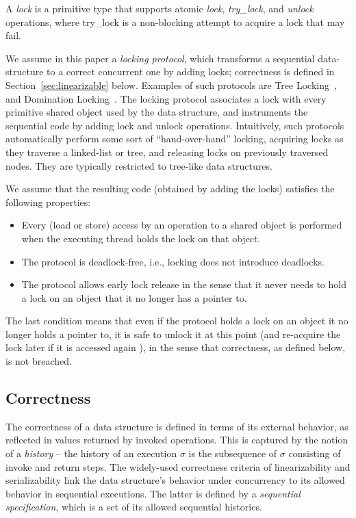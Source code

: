 A \emph{lock} is a primitive type that supports atomic \emph{lock}, \emph{try\_lock}, and \emph{unlock} operations, 
where try\_lock is a non-blocking attempt to acquire a lock that may fail. 

We assume in this paper a \emph{locking protocol}, which transforms a sequential data-structure to a correct concurrent one by adding locks;
correctness is defined in Section~\ref{sec:linearizable} below.
Examples of such protocols are Tree Locking~\cite{tree-locking}, and Domination Locking~\cite{domination-locking}. 
The locking protocol associates a lock with every primitive shared object used by the data structure, and instruments the sequential code 
by adding lock and unlock operations. Intuitively, such protocols automatically perform some sort of ``hand-over-hand'' locking, acquiring locks as
they traverse a linked-list or tree, and releasing locks on previously traversed nodes. They are typically restricted to tree-like data structures.


We assume that the resulting code (obtained by adding the locks) satisfies the following properties:

\begin{itemize}
\item Every (load or store) access by an operation to a shared object is performed when the executing thread holds the lock on that object.
\item The protocol is deadlock-free, i.e., locking  does not introduce deadlocks.
\item The protocol allows early lock release in the sense that  it never needs to hold a lock on an object that it no longer has a pointer to.
 \end{itemize}

The last condition means that even if the protocol holds a lock on an object it no longer holds a pointer to, it is safe to unlock it at this point (and re-acquire the lock later if it is accessed again ), in the sense that correctness, as defined below, is not breached.  


\subsection{Correctness}
\label{ssec:linearizable} 

The correctness of a data structure is defined in terms of its external behavior, as reflected in values returned by invoked operations. 
This is captured by the notion of a \emph{history} -- the history of an execution $\sigma$ is the subsequence  of $\sigma$ consisting 
of invoke and return steps. The widely-used correctness criteria of linearizability and serializability link the data structure's behavior under concurrency to its allowed behavior in sequential executions. The latter is defined by a \emph{sequential specification}, which is a set of its allowed sequential histories. 

